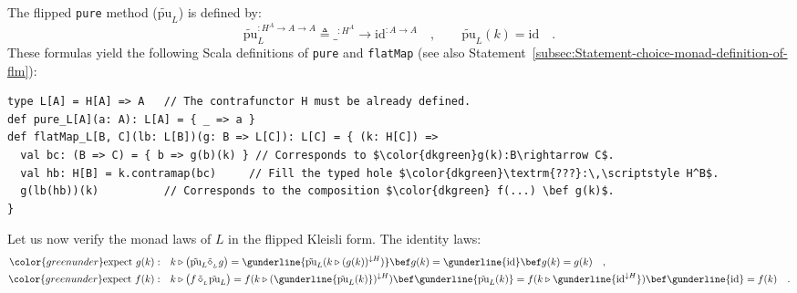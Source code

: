 The flipped \lstinline!pure! method ($\tilde{\text{pu}}_{L}$) is
defined by:
\begin{equation}
\tilde{\text{pu}}_{L}^{:H^{A}\rightarrow A\rightarrow A}\triangleq\_^{:H^{A}}\rightarrow\text{id}^{:A\rightarrow A}\quad,\quad\quad\tilde{\text{pu}}_{L}(k)=\text{id}\quad.\label{eq:def-of-pure-for-exp-construction-h-a-a}
\end{equation}
These formulas yield the following Scala definitions of \lstinline!pure!
and \lstinline!flatMap! (see also Statement~\ref{subsec:Statement-choice-monad-definition-of-flm}):
\begin{lstlisting}[mathescape=true]
type L[A] = H[A] => A   // The contrafunctor H must be already defined.
def pure_L[A](a: A): L[A] = { _ => a }
def flatMap_L[B, C](lb: L[B])(g: B => L[C]): L[C] = { (k: H[C]) =>
  val bc: (B => C) = { b => g(b)(k) } // Corresponds to $\color{dkgreen}g(k):B\rightarrow C$.
  val hb: H[B] = k.contramap(bc)     // Fill the typed hole $\color{dkgreen}\textrm{???}:\,\scriptstyle H^B$.
  g(lb(hb))(k)          // Corresponds to the composition $\color{dkgreen} f(...) \bef g(k)$.
}
\end{lstlisting}

Let us now verify the monad laws of $L$ in the flipped Kleisli form.
The identity laws:
\begin{align*}
{\color{greenunder}\text{expect }g(k):}\quad & k\triangleright\big(\tilde{\text{pu}}_{L}\tilde{\diamond}_{_{L}}g\big)=\gunderline{\tilde{\text{pu}}_{L}(k\triangleright(g(k))^{\downarrow H})}\bef g(k)=\gunderline{\text{id}}\bef g(k)=g(k)\quad,\\
{\color{greenunder}\text{expect }f(k):}\quad & k\triangleright\big(f\,\tilde{\diamond}_{_{L}}\tilde{\text{pu}}_{L}\big)=f(k\triangleright(\gunderline{\tilde{\text{pu}}_{L}(k)})^{\downarrow H})\bef\gunderline{\tilde{\text{pu}}_{L}(k)}=f(k\triangleright\gunderline{\text{id}^{\downarrow H}})\bef\gunderline{\text{id}}=f(k)\quad.
\end{align*}

